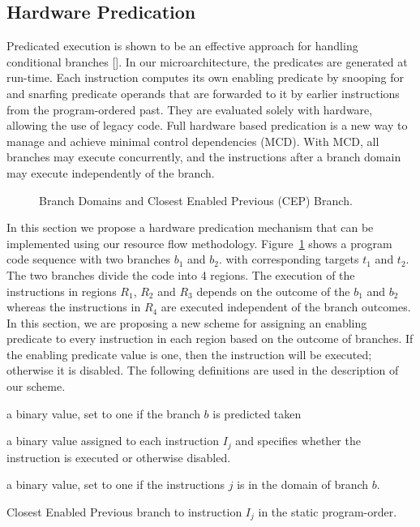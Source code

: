 \documentclass[10pt,twocolumn]{IEEEtran}
\begin{document}
\subsection {Hardware Predication}

Predicated execution is shown to be an effective approach for handling
conditional branches [].  
In our microarchitecture, the predicates are
generated at run-time.  Each instruction computes its own enabling
predicate by snooping for and snarfing predicate operands that are
forwarded to it by earlier instructions from the program-ordered past.
They are evaluated solely with hardware, allowing the use of legacy
code.  Full hardware based predication is a new way to manage and
achieve minimal control dependencies (MCD).  
With MCD, all branches may execute
concurrently, and the instructions after a branch domain ~\cite{Uht91}
may execute independently of the branch.

\begin{figure}
{}
\caption{Branch Domains and Closest Enabled Previous (CEP) Branch.}
\label{fig:brdomain}
\end{figure}  
 
In this section we propose a hardware predication mechanism that can be
implemented using our resource flow methodology.
Figure~\ref{fig:brdomain} shows a program code sequence with two
branches $b_1$ and $b_2$.  with corresponding targets $t_1$ and $t_2$.
The two branches divide the code into 4 regions.  The execution of the
instructions in regions $R_1$, $R_2$ and $R_3$ depends on the outcome
of the $b_1$ and $b_2$ whereas the instructions in $R_4$ are executed
independent of the branch outcomes.  In this section, we are proposing
a new scheme for assigning an enabling predicate to every instruction
in each region based on the outcome of branches.  If the enabling
predicate value is one, then the instruction will be executed;
otherwise it is disabled.  The following definitions are used in the
description of our scheme.

\vspace{0.2 in}
\begin{description}
\item[$T_b$:] a binary value, set to one if the branch $b$ is predicted 
taken
\item[$ex_j$:] a binary value assigned to each instruction $I_j$ and 
specifies whether the instruction is executed or otherwise disabled.
\item[$D_b(I_j)$:] a binary value, set to one if the 
instructions $j$ is in the 
domain of branch $b$.
\item[$CEP(I_j)$:] Closest Enabled Previous branch to instruction $I_j$ in 
the static program-order.
\end{description}
\vspace{0.2 in}
\end{document}
